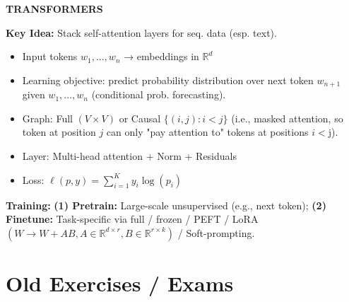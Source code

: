 \documentclass[a4paper,10pt]{article}
\newcommand{\subtitle}[1]{\vspace{0.25cm}\begin{normalsize}\textbf{\textcolor{gray!150}{\uppercase{#1}}}\end{normalsize}}
\begin{document}
\begin{small}
\subtitle{Transformers}

\textbf{Key Idea:} Stack self-attention layers for seq. data (esp. text).

\begin{itemize}
    \item Input tokens $w_1,...,w_n$ → embeddings in $\mathbb{R}^d$
    \item Learning objective: predict probability distribution over next token $w_{n+1}$ given $w_1,...,w_n$ (conditional prob. forecasting).
    \item Graph: Full $(V\times V)$ or Causal $\{(i,j): i<j\}$ (i.e., masked attention, so  token at position $j$ can only "pay attention to" tokens at positions $i< $j).
    \item Layer: Multi-head attention + Norm + Residuals
    \item Loss: $\ell(p,y)=\sum_{i=1}^K y_i\log(p_i)$
\end{itemize}

\textbf{Training:}
\textbf{(1) Pretrain:} Large-scale unsupervised (e.g., next token); \textbf{(2) Finetune:} Task-specific via full / frozen / PEFT / LoRA $(W \to W + AB, A\in\mathbb{R}^{d\times r}, B\in\mathbb{R}^{r\times k})$ / Soft-prompting.

\end{small}



\section*{Old Exercises / Exams}
\end{document}
